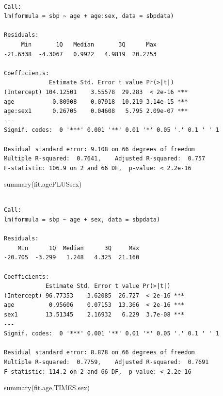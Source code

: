 \documentclass[
  letterpaper,
]{scrbook}
\newenvironment{Shaded}{\begin{snugshade}}{\end{snugshade}}
\newcommand{\FunctionTok}[1]{\textcolor[rgb]{0.28,0.35,0.67}{#1}}
\newcommand{\NormalTok}[1]{\textcolor[rgb]{0.00,0.23,0.31}{#1}}
\begin{document}
\begin{verbatim}

Call:
lm(formula = sbp ~ age + age:sex, data = sbpdata)

Residuals:
     Min       1Q   Median       3Q      Max 
-21.6338  -4.3067   0.9922   4.9819  20.2753 

Coefficients:
             Estimate Std. Error t value Pr(>|t|)    
(Intercept) 104.12501    3.55578  29.283  < 2e-16 ***
age           0.80908    0.07918  10.219 3.14e-15 ***
age:sex1      0.26705    0.04608   5.795 2.09e-07 ***
---
Signif. codes:  0 '***' 0.001 '**' 0.01 '*' 0.05 '.' 0.1 ' ' 1

Residual standard error: 9.108 on 66 degrees of freedom
Multiple R-squared:  0.7641,    Adjusted R-squared:  0.757 
F-statistic: 106.9 on 2 and 66 DF,  p-value: < 2.2e-16
\end{verbatim}

\begin{Shaded}
\begin{Highlighting}[]
\FunctionTok{summary}\NormalTok{(fit.agePLUSsex)}
\end{Highlighting}
\end{Shaded}

\begin{verbatim}

Call:
lm(formula = sbp ~ age + sex, data = sbpdata)

Residuals:
    Min      1Q  Median      3Q     Max 
-20.705  -3.299   1.248   4.325  21.160 

Coefficients:
            Estimate Std. Error t value Pr(>|t|)    
(Intercept) 96.77353    3.62085  26.727  < 2e-16 ***
age          0.95606    0.07153  13.366  < 2e-16 ***
sex1        13.51345    2.16932   6.229  3.7e-08 ***
---
Signif. codes:  0 '***' 0.001 '**' 0.01 '*' 0.05 '.' 0.1 ' ' 1

Residual standard error: 8.878 on 66 degrees of freedom
Multiple R-squared:  0.7759,    Adjusted R-squared:  0.7691 
F-statistic: 114.2 on 2 and 66 DF,  p-value: < 2.2e-16
\end{verbatim}

\begin{Shaded}
\begin{Highlighting}[]
\FunctionTok{summary}\NormalTok{(fit.age.TIMES.sex)}
\end{Highlighting}
\end{Shaded}
\end{document}

